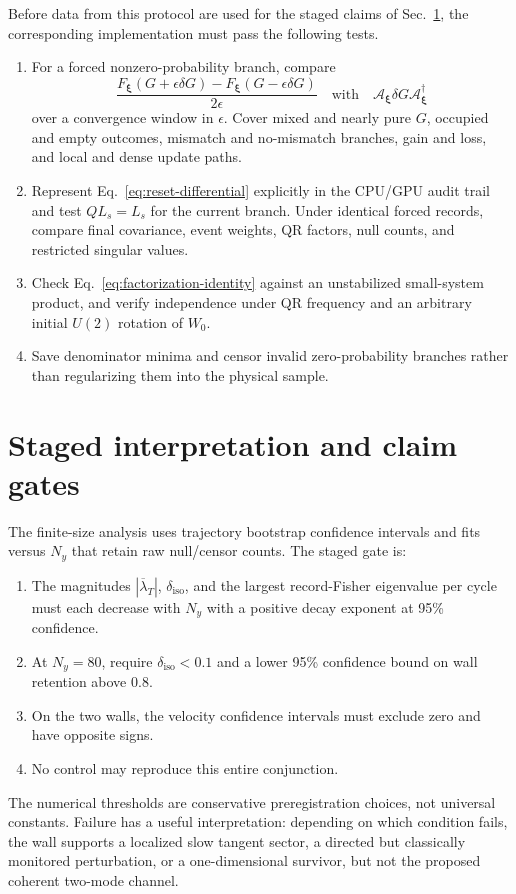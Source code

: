\documentclass[aps,prb,onecolumn,nofootinbib,superscriptaddress]{revtex4-2}
\newcommand{\cA}{\mathcal{A}}
\newcommand{\bxi}{\boldsymbol{\xi}}
\begin{document}
Before data from this protocol are used for the staged claims of
Sec.~\ref{sec:gates}, the corresponding implementation must pass the following
tests.
\begin{enumerate}
 \item For a forced nonzero-probability branch, compare
 \begin{equation}
  \frac{F_{\bxi}(G+\epsilon\delta G)-F_{\bxi}(G-\epsilon\delta G)}{2\epsilon}
  \quad\text{with}\quad
  \cA_{\bxi}\delta G\cA_{\bxi}^\dagger
  \label{eq:finite-difference-test}
 \end{equation}
 over a convergence window in $\epsilon$.  Cover mixed and nearly pure $G$,
 occupied and empty outcomes, mismatch and no-mismatch branches, gain and
 loss, and local and dense update paths.
 \item Represent Eq.~\eqref{eq:reset-differential} explicitly in the CPU/GPU
 audit trail and test $QL_s=L_s$ for the current branch.  Under identical
 forced records, compare final covariance, event weights, QR factors, null
 counts, and restricted singular values.
 \item Check Eq.~\eqref{eq:factorization-identity} against an unstabilized
 small-system product, and verify independence under QR frequency and an
 arbitrary initial $U(2)$ rotation of $W_0$.
 \item Save denominator minima and censor invalid zero-probability branches
 rather than regularizing them into the physical sample.
\end{enumerate}

\section{Staged interpretation and claim gates}
\label{sec:gates}

The finite-size analysis uses trajectory bootstrap confidence intervals and
fits versus $N_y$ that retain raw null/censor counts.  The staged gate is:
\begin{enumerate}
 \item The magnitudes $|\overline\lambda_T|$, $\delta_{\mathrm{iso}}$, and the
 largest record-Fisher eigenvalue per cycle must each decrease with $N_y$ with
 a positive decay exponent at 95\% confidence.
 \item At $N_y=80$, require $\delta_{\mathrm{iso}}<0.1$ and a lower 95\%
 confidence bound on wall retention above $0.8$.
 \item On the two walls, the velocity confidence intervals must exclude zero
 and have opposite signs.
 \item No control may reproduce this entire conjunction.
\end{enumerate}
The numerical thresholds are conservative preregistration choices, not
universal constants.  Failure has a useful interpretation: depending on which
condition fails, the wall supports a localized slow tangent sector, a directed
but classically monitored perturbation, or a one-dimensional survivor, but not
the proposed coherent two-mode channel.
\end{document}
